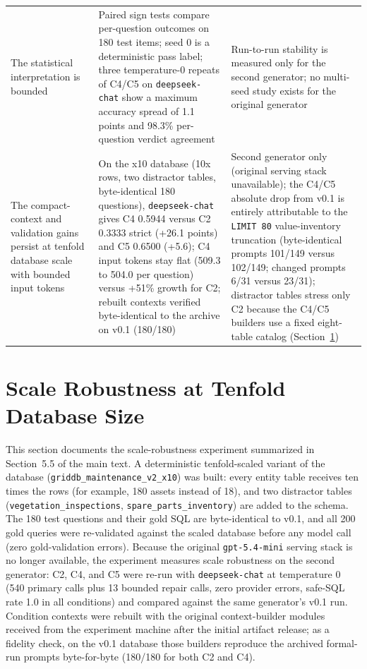 \documentclass[11pt]{article}
\begin{document}
\begin{table}[htbp]
\begin{tabularx}{\textwidth}{p{}Xp{}}
The statistical interpretation is bounded & Paired sign tests compare per-question outcomes on 180 test items; seed 0 is a deterministic pass label; three temperature-0 repeats of C4/C5 on \texttt{deepseek-chat} show a maximum accuracy spread of 1.1 points and 98.3\% per-question verdict agreement & Run-to-run stability is measured only for the second generator; no multi-seed study exists for the original generator \\
The compact-context and validation gains persist at tenfold database scale with bounded input tokens & On the x10 database (10x rows, two distractor tables, byte-identical 180 questions), \texttt{deepseek-chat} gives C4 0.5944 versus C2 0.3333 strict (+26.1 points) and C5 0.6500 (+5.6); C4 input tokens stay flat (509.3 to 504.0 per question) versus +51\% growth for C2; rebuilt contexts verified byte-identical to the archive on v0.1 (180/180) & Second generator only (original serving stack unavailable); the C4/C5 absolute drop from v0.1 is entirely attributable to the \texttt{LIMIT 80} value-inventory truncation (byte-identical prompts 101/149 versus 102/149; changed prompts 6/31 versus 23/31); distractor tables stress only C2 because the C4/C5 builders use a fixed eight-table catalog (Section~\ref{sup:scale}) \\
\bottomrule
\end{tabularx}
\end{table}

\clearpage
\section{Scale Robustness at Tenfold Database Size}\label{sup:scale}

This section documents the scale-robustness experiment summarized in Section~5.5 of the main text. A deterministic tenfold-scaled variant of the database (\texttt{griddb\_maintenance\_v2\_x10}) was built: every entity table receives ten times the rows (for example, 180 assets instead of 18), and two distractor tables (\texttt{vegetation\_inspections}, \texttt{spare\_parts\_inventory}) are added to the schema. The 180 test questions and their gold SQL are byte-identical to v0.1, and all 200 gold queries were re-validated against the scaled database before any model call (zero gold-validation errors). Because the original \texttt{gpt-5.4-mini} serving stack is no longer available, the experiment measures scale robustness on the second generator: C2, C4, and C5 were re-run with \texttt{deepseek-chat} at temperature 0 (540 primary calls plus 13 bounded repair calls, zero provider errors, safe-SQL rate 1.0 in all conditions) and compared against the same generator's v0.1 run. Condition contexts were rebuilt with the original context-builder modules received from the experiment machine after the initial artifact release; as a fidelity check, on the v0.1 database those builders reproduce the archived formal-run prompts byte-for-byte (180/180 for both C2 and C4).
\end{document}
